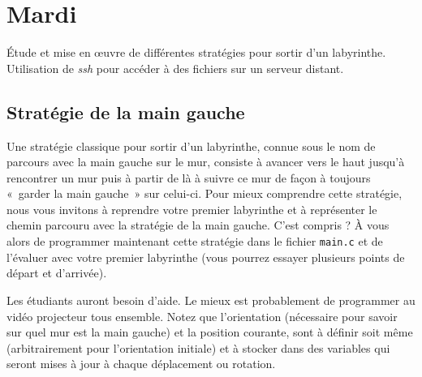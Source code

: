 \documentclass[a4paper]{article}
\newenvironment{objectif}{%
  \begin{framed}%
  \noindent{\bf Objectifs du jour~:}%
}{%
  \end{framed}%
}
\newenvironment{enseignants}[1]{\noindent\color{blue}{\bf #1}}{}
\begin{document}
\section{Mardi}

\begin{objectif}
  Étude et mise en \oe uvre de différentes stratégies pour sortir d’un labyrinthe.
  Utilisation de \emph{ssh} pour accéder à des fichiers sur un serveur distant.
\end{objectif}


\subsection{Stratégie de la main gauche}

Une stratégie classique pour sortir d’un labyrinthe, connue sous le nom de parcours avec la main gauche sur le mur, consiste à avancer vers le haut jusqu'à rencontrer un mur puis à partir de là à suivre ce mur de façon à toujours «~garder la main gauche~» sur celui-ci. %
Pour mieux comprendre cette stratégie, nous vous invitons à reprendre votre premier labyrinthe et à représenter le chemin parcouru avec la stratégie de la main gauche. C’est compris ? \`A vous alors de programmer maintenant cette stratégie dans le fichier \texttt{main.c} et de l’évaluer avec votre premier labyrinthe (vous pourrez essayer plusieurs points de départ et d'arrivée).

\begin{enseignants}{De l'aide~:}
Les étudiants auront besoin d'aide. Le mieux est probablement de programmer au vidéo projecteur tous ensemble. Notez que l'orientation (nécessaire pour savoir sur quel mur est la main gauche) et la position courante, sont à définir soit même (arbitrairement pour l'orientation initiale) et à stocker dans des variables qui seront mises à jour à chaque déplacement ou rotation.
\end{enseignants}
\end{document}
